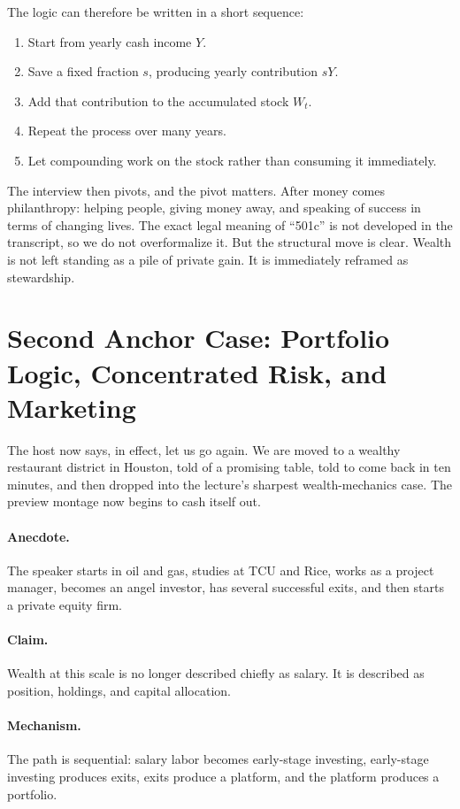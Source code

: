 The logic can therefore be written in a short sequence:
\begin{enumerate}
\item Start from yearly cash income \(Y\).
\item Save a fixed fraction \(s\), producing yearly contribution \(sY\).
\item Add that contribution to the accumulated stock \(W_t\).
\item Repeat the process over many years.
\item Let compounding work on the stock rather than consuming it immediately.
\end{enumerate}

The interview then pivots, and the pivot matters. After money comes philanthropy: helping people, giving money away, and speaking of success in terms of changing lives. The exact legal meaning of ``501c'' is not developed in the transcript, so we do not overformalize it. But the structural move is clear. Wealth is not left standing as a pile of private gain. It is immediately reframed as stewardship.

\section{Second Anchor Case: Portfolio Logic, Concentrated Risk, and Marketing}

The host now says, in effect, let us go again. We are moved to a wealthy restaurant district in Houston, told of a promising table, told to come back in ten minutes, and then dropped into the lecture's sharpest wealth-mechanics case. The preview montage now begins to cash itself out.

\paragraph{Anecdote.} The speaker starts in oil and gas, studies at TCU and Rice, works as a project manager, becomes an angel investor, has several successful exits, and then starts a private equity firm.

\paragraph{Claim.} Wealth at this scale is no longer described chiefly as salary. It is described as position, holdings, and capital allocation.

\paragraph{Mechanism.} The path is sequential: salary labor becomes early-stage investing, early-stage investing produces exits, exits produce a platform, and the platform produces a portfolio.

